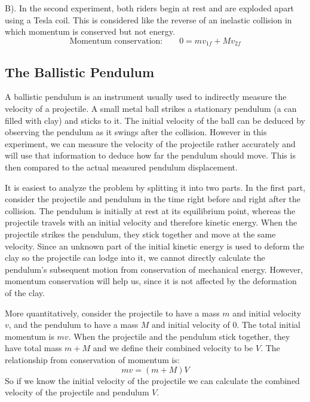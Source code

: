 B). In the second experiment, both riders begin at rest and are exploded apart using a Tesla coil. This is considered like the reverse of an inelastic collision in which momentum is conserved but not energy.
\begin{equation}
  \textrm{Momentum conservation:}\qquad  0= mv_{1f}+Mv_{2f}
\end{equation}

\subsection{The Ballistic Pendulum}
A ballistic pendulum is an instrument usually used to indirectly measure the velocity of a projectile. A small metal ball strikes a stationary pendulum (a can filled with clay) and sticks to it. The initial velocity of the ball can be deduced by observing the pendulum as it swings after the collision. However in this experiment, we can measure the velocity of the projectile rather accurately and will use that information to deduce how far the pendulum should move. This is then compared to the actual measured pendulum displacement.\myskip

It is easiest to analyze the problem by splitting it into two parts. In the first part, consider the projectile and pendulum in the time right before and right after the collision. The pendulum is initially at rest at its equilibrium point, whereas the projectile travels with an initial velocity and therefore kinetic energy. When the projectile strikes the pendulum, they stick together and move at the same velocity. Since an unknown part of the initial kinetic energy is used to deform the clay so the projectile can lodge into it, we cannot directly calculate the pendulum’s subsequent motion from conservation of mechanical energy. However, momentum conservation will help us, since it is not affected by the deformation of the clay.\myskip

More quantitatively, consider the projectile to have a mass $m$ and initial velocity $v$, and the pendulum to have a mass $M$ and initial velocity of 0. The total initial momentum is $mv$. When the projectile and the pendulum stick together, they have total mass $m + M$ and we define their combined velocity to be $V$. The relationship from conservation of momentum is:
\begin{equation}
  mv=(m+M)V
\end{equation}
So if we know the initial velocity of the projectile we can calculate the combined velocity of the projectile and pendulum $V$.\myskip

